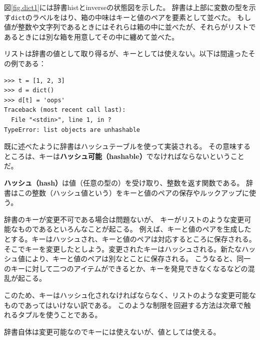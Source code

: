 \documentclass[a4j,12pt,makeidx]{jbook}
\begin{document}
図\ref{fig.dict1}には辞書histとinverseの状態図を示した。
辞書は上部に変数の型を示す{\tt dict}のラベルをはり、箱の中味はキーと値のペアを要素として並べた。
もし値が整数や文字列であるときにはそれらは箱の中に並べたが、それらがリストであるときには別な箱を用意してその中に纏めて並べた。\par
リストは辞書の値として取り得るが、キーとしては使えない。以下は間違ったその例である：
\begin{verbatim}
>>> t = [1, 2, 3]
>>> d = dict()
>>> d[t] = 'oops'
Traceback (most recent call last):
  File "<stdin>", line 1, in ?
TypeError: list objects are unhashable
\end{verbatim}
既に述べたように辞書はハッシュテーブルを使って実装される。
その意味するところは、キーは{\bf ハッシュ可能（hashable）}でなければならないということだ。\par
{\bf ハッシュ（hash）}は値（任意の型の）を受け取り、整数を返す関数である。
辞書はこの整数（ハッシュ値という）をキーと値のペアの保存やルックアップに使う。\par
辞書のキーが変更不可である場合は問題ないが、
キーがリストのような変更可能なものであるといろんなことが起こる。
例えば、キーと値のペアを生成したとする。キーはハッシュされ、キーと値のペアは対応するところに保存される。
そこでキーを変更したとしよう。変更されたキーはハッシュされる。新たなハッシュ値により、キーと値のペアは別なとことに保存される。
こうなると、同一のキーに対して二つのアイテムができるとか、キーを発見できなくなるなどの混乱が起こる。\par
このため、キーはハッシュ化されなければならなく、リストのような変更可能なものであってはいけない訳である。
このような制限を回避する方法は次章で触れるタプルを使うことである。\par
辞書自体は変更可能なのでキーには使えないが、値としては使える。
%
\end{document}
